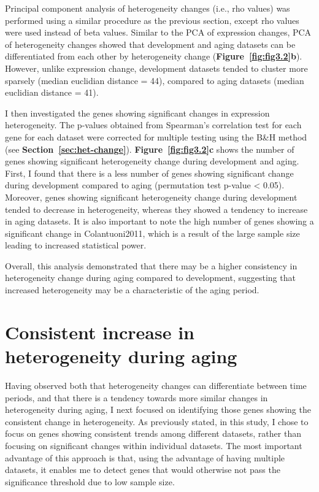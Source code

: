 Principal component analysis of heterogeneity changes (i.e., rho values) was performed using a similar procedure as the previous section, 
except rho values were used instead of beta values. 
Similar to the PCA of expression changes, PCA of heterogeneity changes showed that development and aging datasets can be differentiated from each other by heterogeneity change (\textbf{Figure~\ref{fig:fig3.2}b}).
However, unlike expression change, development datasets tended to cluster more sparsely (median euclidian distance = 44), compared to aging datasets (median euclidian distance = 41).

I then investigated the genes showing significant changes in expression heterogeneity. 
The p-values obtained from Spearman's correlation test for each gene for each dataset were corrected for multiple testing using the B{\&}H method (see \textbf{Section~\ref{sec:het-change}}).
\textbf{Figure~\ref{fig:fig3.2}c} shows the number of genes showing significant heterogeneity change during development and aging.
First, I found that there is a less number of genes showing significant change during development compared to aging (permutation test p-value < 0.05).
Moreover, genes showing significant heterogeneity change during development tended to decrease in heterogeneity, whereas they showed a tendency to increase in aging datasets.
It is also important to note the high number of genes showing a significant change in Colantuoni2011, which is a result of the large sample size leading to increased statistical power.

Overall, this analysis demonstrated that there may be a higher consistency in heterogeneity change during aging compared to development, 
suggesting that increased heterogeneity may be a characteristic of the aging period.

\section{Consistent increase in heterogeneity during aging}
Having observed both that heterogeneity changes can differentiate between time periods, and that there is a tendency towards more similar changes in heterogeneity during aging,
I next focused on identifying those genes showing the consistent change in heterogeneity.
As previously stated, in this study, I chose to focus on genes showing consistent trends among different datasets, rather than focusing on significant changes within individual datasets.
The most important advantage of this approach is that, using the advantage of having multiple datasets, 
it enables me to detect genes that would otherwise not pass the significance threshold due to low sample size.

